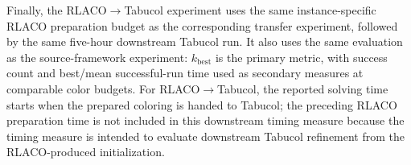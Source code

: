 Finally, the RLACO$\rightarrow$Tabucol experiment uses the same
instance-specific RLACO preparation budget as the corresponding
transfer experiment, followed by the same five-hour downstream
Tabucol run. It also uses the same evaluation  as the
source-framework experiment: $k_{\mathrm{best}}$ is the primary metric,
with success count and best/mean successful-run time used as secondary
measures at comparable color budgets. For
RLACO$\rightarrow$Tabucol, the reported solving time starts when the
prepared coloring is handed to Tabucol; the preceding RLACO
preparation time is not included in this downstream timing measure because the timing measure is intended to evaluate
downstream Tabucol refinement from the RLACO-produced initialization.
